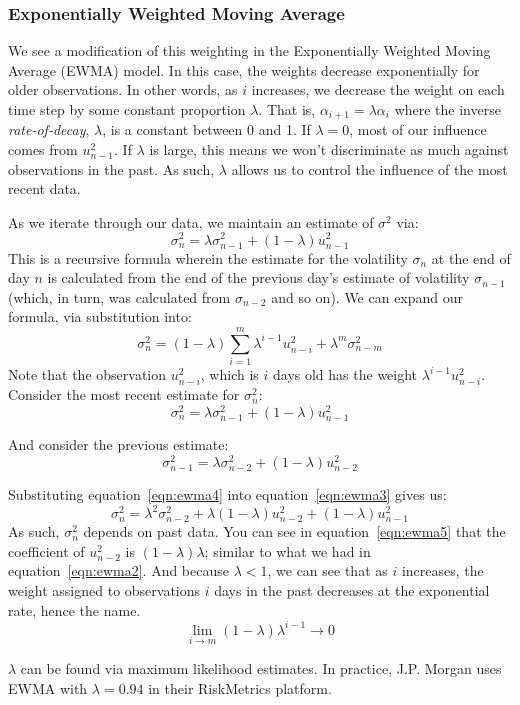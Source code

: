 \documentclass[../background_research.tex]{subfiles}
\begin{document}
\subsubsection{Exponentially Weighted Moving Average}
We see a modification of this weighting in the Exponentially Weighted Moving Average (EWMA) model.
In this case, the weights decrease exponentially for older observations.
In other words, as $i$ increases, we decrease the weight on each time step by some constant proportion $\lambda$.
That is, $\alpha_{i+1} = \lambda{\alpha_i}$ where the inverse \textit{rate-of-decay}, $\lambda$, is a constant between 0 and 1.
If $\lambda=0$, most of our influence comes from $u^2_{n-1}$.
If $\lambda$ is large, this means we won't discriminate as much against observations in the past.
As such, $\lambda$ allows us to control the influence of the most recent data.

As we iterate through our data, we maintain an estimate of $\sigma^2$ via:
\begin{equation}
    \label{eqn:ewma1}
    \sigma^2_n = \lambda{\sigma^2_{n-1}} + (1-\lambda){u^2_{n-1}}
\end{equation}
This is a recursive formula wherein the estimate for the volatility $\sigma_n$ at the end of day $n$ is calculated from the end of the previous day's estimate of volatility $\sigma_{n-1}$ (which, in turn, was calculated from $\sigma_{n-2}$ and so on).
We can expand our formula, via substitution into:
\begin{equation}
    \label{eqn:ewma2}
    \sigma^2_n=(1-\lambda)\sum_{i=1}^m\lambda^{i-1}u^2_{n-i}+\lambda^m\sigma^2_{n-m}
\end{equation}
Note that the observation $u^2_{n-i}$, which is $i$ days old has the weight $\lambda^{i-1}u^2_{n-i}$.
Consider the most recent estimate for $\sigma^2_n$:
\begin{equation}
    \label{eqn:ewma3}
    \sigma^2_n = \lambda{\sigma^2_{n-1}} + (1 - \lambda){u^2_{n-1}}
\end{equation}

And consider the previous estimate:
\begin{equation}
    \label{eqn:ewma4}
    \sigma^2_{n-1}=\lambda{\sigma^2_{n-2}+(1-\lambda)u^2_{n-2}}
\end{equation}

Substituting equation~\ref{eqn:ewma4} into equation~\ref{eqn:ewma3} gives us:
\begin{equation}
    \label{eqn:ewma5}
    \sigma^2_n = \lambda^2{\sigma^2_{n-2}} + \lambda(1-\lambda){u^2_{n-2}} + (1-\lambda){u^2_{n-1}}
\end{equation}
As such, $\sigma^2_n$ depends on past data.
You can see in equation~\ref{eqn:ewma5} that the coefficient of $u^2_{n-2}$ is $(1-\lambda)\lambda$; similar to what we had in equation~\ref{eqn:ewma2}.
And because $\lambda < 1$, we can see that as $i$ increases, the weight assigned to observations $i$ days in the past decreases at the exponential rate, hence the name.
\begin{equation}
    \label{eqn:ewma6}
    \lim_{i \to m} (1-\lambda)\lambda^{i-1} \rightarrow 0
\end{equation}

$\lambda$ can be found via maximum likelihood estimates.
In practice, J.P. Morgan uses EWMA with $\lambda = 0.94$ in their RiskMetrics platform.
\end{document}
